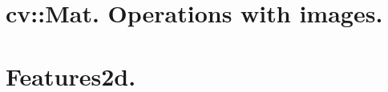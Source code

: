 
\chapter{cv::Mat. Operations with images.}
\renewcommand{\curModule}{cv::Mat. Operations with images.}

\chapter{Features2d.}
\renewcommand{\curModule}{Features2d}

